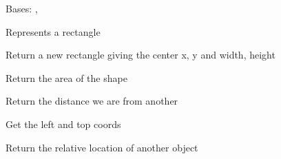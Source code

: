 \documentclass[letterpaper,10pt,english]{sphinxmanual}
\begin{document}
\begin{fulllineitems}
\label{geometry:serge.geometry.Rectangle}
Bases: {\hyperref[geometry:serge.geometry.SpatialObject]{}}, {\hyperref[common:serge.serialize.Serializable]{}}

Represents a rectangle

\begin{fulllineitems}
\label{geometry:serge.geometry.Rectangle.fromCenter}
Return a new rectangle giving the center x, y and width, height

\end{fulllineitems}


\begin{fulllineitems}
\label{geometry:serge.geometry.Rectangle.getArea}
Return the area of the shape

\end{fulllineitems}


\begin{fulllineitems}
\label{geometry:serge.geometry.Rectangle.getDistanceFrom}
Return the distance we are from another

\end{fulllineitems}


\begin{fulllineitems}
\label{geometry:serge.geometry.Rectangle.getOrigin}
Get the left and top coords

\end{fulllineitems}


\begin{fulllineitems}
\label{geometry:serge.geometry.Rectangle.getRelativeLocation}
Return the relative location of another object


\end{fulllineitems}
\end{fulllineitems}
\end{document}
